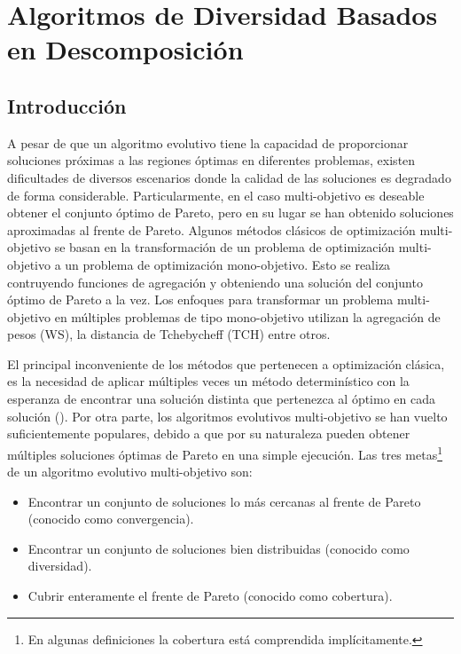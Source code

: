 \chapter{Algoritmos de Diversidad Basados en Descomposición} %

\label{Chapter4}

\section*{Introducción}


A pesar de que un algoritmo evolutivo tiene la capacidad de proporcionar soluciones próximas a las regiones óptimas en diferentes problemas, existen dificultades de diversos escenarios donde la calidad de las soluciones es degradado de forma considerable.
%
Particularmente, en el caso multi-objetivo es deseable obtener el conjunto óptimo de Pareto, pero en su lugar se han obtenido soluciones aproximadas al frente de Pareto.
%
Algunos métodos clásicos de optimización multi-objetivo se basan en la transformación de un problema de optimización multi-objetivo a un problema de optimización mono-objetivo.
%
Esto se realiza contruyendo funciones de agregación y obteniendo una solución del conjunto óptimo de Pareto a la vez.
%
Los enfoques para transformar un problema multi-objetivo en múltiples problemas de tipo mono-objetivo utilizan la agregación de pesos (WS), la distancia de Tchebycheff (TCH) entre otros.
%

El principal inconveniente de los métodos que pertenecen a optimización clásica, es la necesidad de aplicar múltiples veces un método determinístico con la esperanza de encontrar una solución distinta que pertenezca al óptimo en cada solución (\cite{Joel:Kalyanmoy}).
%
Por otra parte, los algoritmos evolutivos multi-objetivo se han vuelto suficientemente populares, debido a que por su naturaleza pueden obtener múltiples soluciones óptimas de Pareto en una simple ejecución.
%
Las tres metas\footnote{En algunas definiciones la cobertura está comprendida implícitamente.} de un algoritmo evolutivo multi-objetivo son:

\begin{itemize}
\item Encontrar un conjunto de soluciones lo más cercanas al frente de Pareto (conocido como convergencia).
\item Encontrar un conjunto de soluciones bien distribuidas (conocido como diversidad).
\item Cubrir enteramente el frente de Pareto (conocido como cobertura).
\end{itemize}


